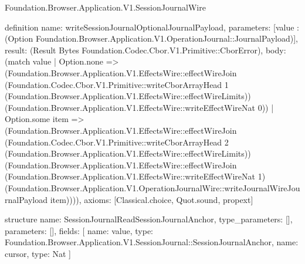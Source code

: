 \begin{lexlean}{Foundation.Browser.Application.V1.SessionJournalWire}
\begin{semanticmodule}
definition{
  name: writeSessionJournalOptionalJournalPayload,
  parameters: [value : (Option Foundation.Browser.Application.V1.OperationJournal::JournalPayload)],
  result: (Result Bytes Foundation.Codec.Cbor.V1.Primitive::CborError),
  body: (match value
    | Option.none => (Foundation.Browser.Application.V1.EffectsWire::effectWireJoin (Foundation.Codec.Cbor.V1.Primitive::writeCborArrayHead 1 (Foundation.Browser.Application.V1.EffectsWire::effectWireLimits)) (Foundation.Browser.Application.V1.EffectsWire::writeEffectWireNat 0))
    | Option.some item => (Foundation.Browser.Application.V1.EffectsWire::effectWireJoin (Foundation.Codec.Cbor.V1.Primitive::writeCborArrayHead 2 (Foundation.Browser.Application.V1.EffectsWire::effectWireLimits)) (Foundation.Browser.Application.V1.EffectsWire::effectWireJoin (Foundation.Browser.Application.V1.EffectsWire::writeEffectWireNat 1) (Foundation.Browser.Application.V1.OperationJournalWire::writeJournalWireJournalPayload item)))),
  axioms: [Classical.choice, Quot.sound, propext]
}

structure{
  name: SessionJournalReadSessionJournalAnchor,
  type_parameters: [],
  parameters: [],
  fields: [
    {name: value, type: Foundation.Browser.Application.V1.SessionJournal::SessionJournalAnchor},
    {name: cursor, type: Nat}
  ]
}


\end{semanticmodule}
\end{lexlean}
